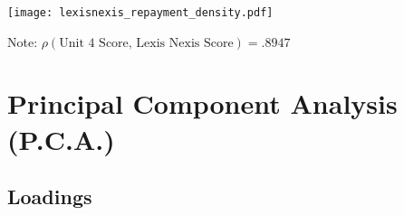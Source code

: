 \documentclass[a4paper, landscape]{article}
\begin{document}
\newpage

\begin{center}
\texttt{[image: lexisnexis\_repayment\_density.pdf]}
\end{center}

\begin{center}
Note: $ \rho( \text{Unit 4 Score, Lexis Nexis Score}) = .8947$
\end{center}

\newpage



\newpage
\section{Principal Component Analysis (P.C.A.)}

\subsection{Loadings}
\end{document}

